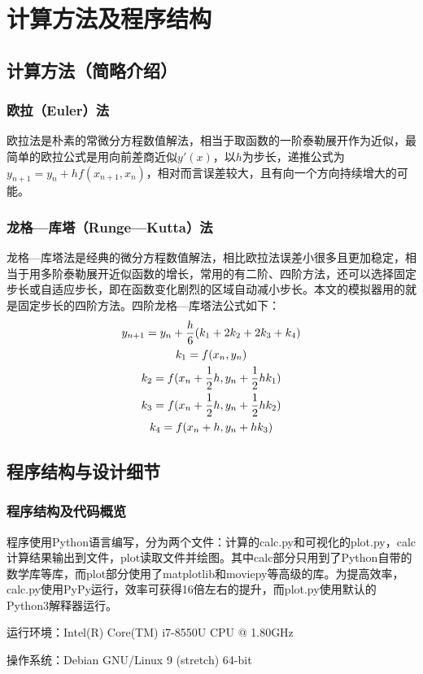 \documentclass[UTF-8,cs4size]{ctexart}
\begin{document}
\section{计算方法及程序结构}
\subsection{计算方法（简略介绍）}
\subsubsection{欧拉（Euler）法}
欧拉法是朴素的常微分方程数值解法，相当于取函数的一阶泰勒展开作为近似，最简单的欧拉公式是用向前差商近似$y'(x)$，以$h$为步长，递推公式为$y_{n+1} = y_n + hf(x_{n+1},x_{n})$，相对而言误差较大，且有向一个方向持续增大的可能。
\subsubsection{龙格—库塔（Runge—Kutta）法}
龙格—库塔法是经典的微分方程数值解法，相比欧拉法误差小很多且更加稳定，相当于用多阶泰勒展开近似函数的增长，常用的有二阶、四阶方法，还可以选择固定步长或自适应步长，即在函数变化剧烈的区域自动减小步长。本文的模拟器用的就是固定步长的四阶方法。四阶龙格—库塔法公式如下：
\begin{gather}
	y_{n+1} = y_n + \frac{h}{6}(k_1+2k_2+2k_3+k_4) \notag \\
	k_1 = f(x_n,y_n) \notag \\
	k_2 = f(x_n+\frac12h,y_n+\frac12hk_1) \notag \\
	k_3 = f(x_n+\frac12h,y_n+\frac12hk_2) \notag \\
	k_4 = f(x_n+h,y_n+hk_3)
\end{gather}
\subsection{程序结构与设计细节}
\subsubsection{程序结构及代码概览}
程序使用Python语言编写，分为两个文件：计算的calc.py和可视化的plot.py，calc计算结果输出到文件，plot读取文件并绘图。其中calc部分只用到了Python自带的数学库等库，而plot部分使用了matplotlib和moviepy等高级的库。为提高效率，calc.py使用PyPy运行，效率可获得16倍左右的提升，而plot.py使用默认的Python3解释器运行。


运行环境：Intel(R) Core(TM) i7-8550U CPU @ 1.80GHz


操作系统：Debian GNU/Linux 9 (stretch) 64-bit
\end{document}
